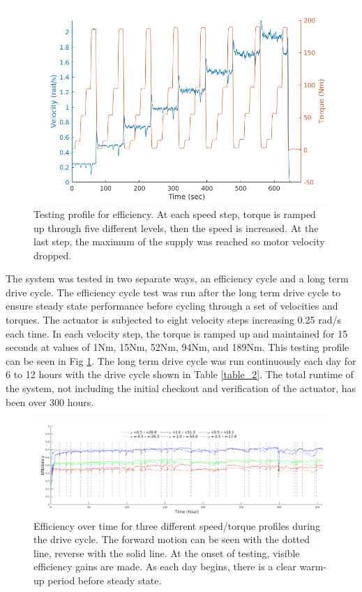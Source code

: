 \begin{figure}[!b]
   \centering
   \includegraphics[width=\linewidth]{images/eff_test_profile_v4}
   \caption{Testing profile for efficiency.
   At each speed step, torque is ramped up through five different levels, then the speed is increased.
   At the last step, the maximum of the supply was reached so motor velocity dropped.}
   \label{eff_profile}
\end{figure}

The system was tested in two separate ways, an efficiency cycle and a long term drive cycle.
The efficiency cycle test was run after the long term drive cycle to ensure steady state performance before cycling through a set of velocities and torques.
The actuator is subjected to eight velocity steps increasing 0.25 rad/s each time.
In each velocity step, the torque is ramped up and maintained for 15 seconds at values of 1Nm, 15Nm, 52Nm, 94Nm, and 189Nm.
This testing profile can be seen in Fig \ref{eff_profile}.
The long term drive cycle was run continuously each day for 6 to 12 hours with the drive cycle shown in Table \ref{table_2}.
The total runtime of the system, not including the initial checkout and verification of the actuator, has been over 300 hours.


\begin{figure}[!t]
	\centering
	\includegraphics[width=0.9\linewidth]{images/total_runtime}
	\caption{Efficiency over time for three different speed/torque profiles during the drive cycle.
		The forward motion can be seen with the dotted line, reverse with the solid line.
		At the onset of testing, visible efficiency gains are made.
		As each day begins, there is a clear warm-up period before steady state.
	}
	\label{long_run}
\end{figure}


